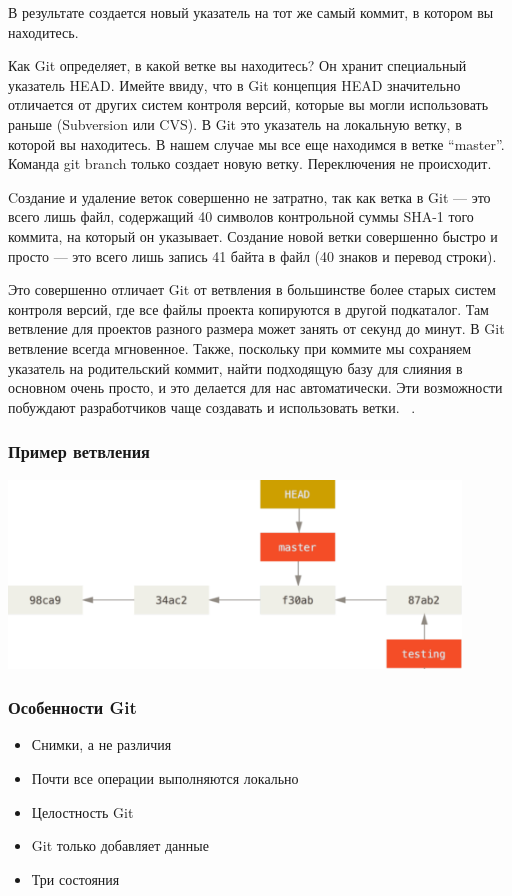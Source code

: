 \documentclass{../industrial-development}
\begin{document}
В результате создается новый указатель на тот же самый коммит, в котором вы находитесь.

Как Git определяет, в какой ветке вы находитесь? Он хранит специальный указатель HEAD. Имейте ввиду, что в Git концепция HEAD значительно отличается от других систем контроля версий, которые вы могли использовать раньше (Subversion или CVS). В Git это указатель на локальную ветку, в которой вы находитесь. В нашем случае мы все еще находимся в ветке “master”. Команда git branch только создает новую ветку. Переключения не происходит.

Cоздание и удаление веток совершенно не затратно, так как ветка в Git — это всего лишь файл, содержащий 40 символов контрольной суммы SHA-1 того коммита, на который он указывает. Создание новой ветки совершенно быстро и просто — это всего лишь запись 41 байта в файл (40 знаков и перевод строки).

Это совершенно отличает Git от ветвления в большинстве более старых систем контроля версий, где все файлы проекта копируются в другой подкаталог. Там ветвление для проектов разного размера может занять от секунд до минут. В Git ветвление всегда мгновенное. Также, поскольку при коммите мы сохраняем указатель на родительский коммит, найти подходящую базу для слияния в основном очень просто, и это делается для нас автоматически. Эти возможности побуждают разработчиков чаще создавать и использовать ветки.
~\cite[15-17]{ProGit}.

\begin{frame} \frametitle{Пример ветвления}
  \centerline{\includegraphics[width=0.9\textwidth]{branching-git.pdf}}
\end{frame}

\begin{frame} \frametitle{Особенности Git}
  \begin{itemize}
  \item Снимки, а не различия
  \item Почти все операции выполняются локально
  \item Целостность Git
  \item Git только добавляет данные
  \item Три состояния
  \end{itemize}
\end{frame}
\end{document}
